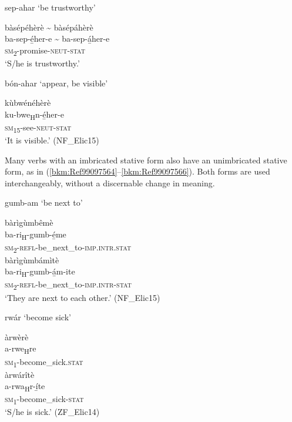 \ea
\label{bkm:Ref490209104}
\ea
sep-ahar ‘be trustworthy’

\ex
\glll bàsépéhèrè {\textasciitilde} bàsépáhèrè\\
ba-sep-é̲her-e {\textasciitilde} ba-sep-á̲her-e\\
\textsc{sm}\textsubscript{2}-promise-\textsc{neut}-\textsc{stat}\\
\glt ‘S/he is trustworthy.’
\z\z

\ea
\label{bkm:Ref490209052}
\ea
bón-ahar ‘appear, be visible’

\ex
\glll kùbwénéhèrè\\
ku-bwe\textsubscript{H}n-é̲her-e\\
\textsc{sm}\textsubscript{15}-see-\textsc{neut}-\textsc{stat}\\
\glt ‘It is visible.’ (NF\_Elic15)
\z\z

Many verbs with an imbricated stative form also have an unimbricated stative form, as in (\ref{bkm:Ref99097564}--\ref{bkm:Ref99097566}). Both forms are used interchangeably, without a discernable change in meaning.

\ea
\label{bkm:Ref99097564}
\ea
gumb-am ‘be next to’

\ex
\glll bàrìgùmbêmè\\
ba-ri\textsubscript{H}-gumb-é̲me\\
\textsc{sm}\textsubscript{2}-\textsc{refl}-be\_next\_to-\textsc{imp}.\textsc{intr}.\textsc{stat}\\

\ex
\glll bàrìgùmbámìtè\\
ba-ri\textsubscript{H}-gumb-á̲m-ite\\
\textsc{sm}\textsubscript{2}-\textsc{refl}-be\_next\_to-\textsc{imp}.\textsc{intr}-\textsc{stat}\\
\glt ‘They are next to each other.’ (NF\_Elic15)
\z\z

\ea
\label{bkm:Ref99097566}
\ea
rwár ‘become sick’

\ex
\glll àrwèrè\\
a-rwe\textsubscript{H}re\\
\textsc{sm}\textsubscript{1}-become\_sick.\textsc{stat}\\

\ex
\glll àrwárîtè\\
a-rwa\textsubscript{H}r-í̲te\\
\textsc{sm}\textsubscript{1}-become\_sick-\textsc{stat}\\
\glt ‘S/he is sick.’ (ZF\_Elic14)
\z\z

